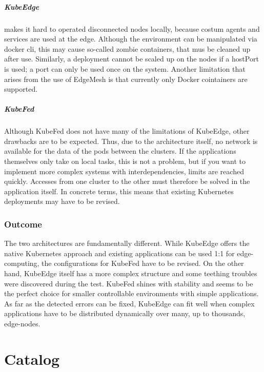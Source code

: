 \documentclass[MSC,Master,english]{twbook}%
\begin{document}
\paragraph{KubeEdge} makes it hard to operated disconnected nodes locally, because costum agents and services are used at the edge. Although the environment can be manipulated via docker cli, this may cause so-called zombie containers, that mus be cleaned up after use. Similarly, a deployment cannot be scaled up on the nodes if a hostPort is used; a port can only be used once on the system. Another limitation that arises from the use of EdgeMesh is that currently only Docker cointainers are supported.

\paragraph{KubeFed} Although KubeFed does not have many of the limitations of KubeEdge, other drawbacks are to be expected. Thus, due to the architecture itself, no network is available for the data of the pods between the clusters. If the applications themselves only take on local tasks, this is not a problem, but if you want to implement more complex systems with interdependencies, limits are reached quickly. Accesses from one cluster to the other must therefore be solved in the application itself. In concrete terms, this means that existing Kubernetes deployments may have to be revised.

\subsection{Outcome} The two architectures are fundamentally different. While KubeEdge offers the native Kubernetes approach and existing applications can be used 1:1 for edge-computing, the configurations for KubeFed have to be revised. On the other hand, KubeEdge itself has a more complex structure and some teething troubles were discovered during the test. KubeFed shines with stability and seems to be the perfect choice for smaller controllable environments with simple applications. As far as the detected errors can be fixed, KubeEdge can fit well when complex applications have to be distributed dynamically over many, up to thousands, edge-nodes.

\chapter{Catalog}
\label{chap:catalog}
\end{document}
